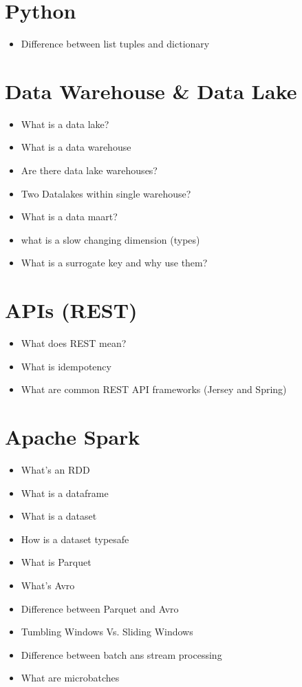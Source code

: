 \documentclass[12pt, numbers=noenddot]{scrreprt} %
\begin{document}
\section*{Python}

\begin{itemize}
\item Difference between list tuples and dictionary
\end{itemize}

\section*{Data Warehouse \& Data Lake}

\begin{itemize}
\item What is a data lake?
\item What is a data warehouse
\item Are there data lake warehouses?
\item Two Datalakes within single warehouse?
\item What is a data maart?
\item what is a slow changing dimension (types)
\item What is a surrogate key and why use them?
\end{itemize}

\section*{APIs (REST)}

\begin{itemize}
\item What does REST mean?
\item What is idempotency
\item What are common REST API frameworks (Jersey and Spring)
\end{itemize}

\section*{Apache Spark}

\begin{itemize}
\item What's an RDD
\item What is a dataframe
\item What is a dataset
\item How is a dataset typesafe
\item What is Parquet
\item What's Avro
\item Difference between Parquet and Avro
\item Tumbling Windows Vs. Sliding Windows
\item Difference between batch ans stream processing
\item What are microbatches
\end{itemize}
\end{document}
